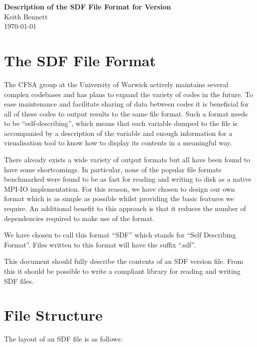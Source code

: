 \documentclass[12pt]{article}
\newcommand{\subsec}{\section}
\begin{document}
\begin{center}
{\huge\bfseries Description of the SDF File Format for
  Version {\sdfversion}}\\[0.4cm]
{\Large Keith Bennett}\\[0.1cm]
{\large\today}\\[0.4cm]
\end{center}
\fi


\section{The SDF File Format}
\label{sec:sdf}
The CFSA group at the University of Warwick actively maintains several
complex codebases and has plans to expand the variety of codes in the future.
To ease maintenance and facilitate sharing of data between codes it is
beneficial for all of these codes to output results to the same file format.
Such a format needs to be ``self-describing'', which means that each variable
dumped to the file is accompanied by a description of the variable and enough
information for a visualisation tool to know how to display its contents in a
meaningful way.

There already exists a wide variety of output formats but all have been found
to have some shortcomings. In particular, none of the popular file formats
benchmarked were found to be as fast for reading and writing to disk as
a native MPI-IO implementation. For this reason, we have chosen to design our
own format which is as simple as possible whilst providing the basic features
we require. An additional benefit to this approach is that it reduces the
number of dependencies required to make use of the format.

We have chosen to call this format ``SDF'' which stands for ``Self Describing
Format''. Files written to this format will have the suffix ``.sdf''.

This document should fully describe the contents of an SDF version {\sdfversion}
file. From this it should be possible to write a compliant library for
reading and writing SDF files.

\subsec{File Structure}

The layout of an SDF file is as follows:\\
\end{document}
